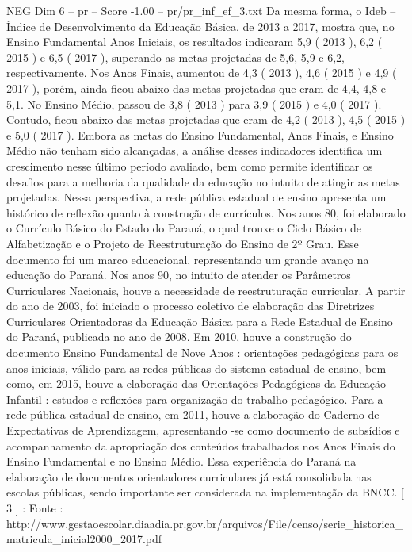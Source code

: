 \begin{textsample}{NEG Dim 6 – pr – Score -1.00 – pr/pr\_inf\_ef\_3.txt}
Da mesma forma, o Ideb – Índice de Desenvolvimento da Educação Básica, de 2013 a 2017, mostra que, no Ensino Fundamental Anos Iniciais, os resultados indicaram 5,9 ( 2013 ), 6,2 ( 2015 ) e 6,5 ( 2017 ), superando as metas projetadas de 5,6, 5,9 e 6,2, respectivamente.
Nos Anos Finais, aumentou de 4,3 ( 2013 ), 4,6 ( 2015 ) e 4,9 ( 2017 ), porém, ainda ficou abaixo das metas projetadas que eram de 4,4, 4,8 e 5,1.
No Ensino Médio, passou de 3,8 ( 2013 ) para 3,9 ( 2015 ) e 4,0 ( 2017 ).
Contudo, ficou abaixo das metas projetadas que eram de 4,2 ( 2013 ), 4,5 ( 2015 ) e 5,0 ( 2017 ).
Embora as metas do Ensino Fundamental, Anos Finais, e Ensino Médio não tenham sido alcançadas, a análise desses indicadores identifica um crescimento nesse último período avaliado, bem como permite identificar os desafios para a melhoria da qualidade da educação no intuito de atingir as metas projetadas.
Nessa perspectiva, a rede pública estadual de ensino apresenta um histórico de reflexão quanto à construção de currículos.
Nos anos 80, foi elaborado o Currículo Básico do Estado do Paraná, o qual trouxe o Ciclo Básico de Alfabetização e o Projeto de Reestruturação do Ensino de 2º Grau.
Esse documento foi um marco educacional, representando um grande avanço na educação do Paraná.
Nos anos 90, no intuito de atender os Parâmetros Curriculares Nacionais, houve a necessidade de reestruturação curricular.
A partir do ano de 2003, foi iniciado o processo coletivo de elaboração das Diretrizes Curriculares Orientadoras da Educação Básica para a Rede Estadual de Ensino do Paraná, publicada no ano de 2008.
Em 2010, houve a construção do documento Ensino Fundamental de Nove Anos : orientações pedagógicas para os anos iniciais, válido para as redes públicas do sistema estadual de ensino, bem como, em 2015, houve a elaboração das Orientações Pedagógicas da Educação Infantil : estudos e reflexões para organização do trabalho pedagógico.
Para a rede pública estadual de ensino, em 2011, houve a elaboração do Caderno de Expectativas de Aprendizagem, apresentando -se como documento de subsídios e acompanhamento da apropriação dos conteúdos trabalhados nos Anos Finais do Ensino Fundamental e no Ensino Médio.
Essa experiência do Paraná na elaboração de documentos orientadores curriculares já está consolidada nas escolas públicas, sendo importante ser considerada na implementação da BNCC. [ 3 ] : Fonte : http://www.gestaoescolar.diaadia.pr.gov.br/arquivos/File/censo/serie\_historica\_matricula\_inicial2000\_2017.pdf

\end{textsample}
